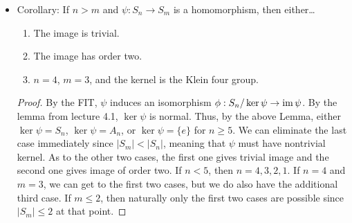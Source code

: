 \documentclass[../notes.tex]{subfiles}
\begin{document}
\begin{itemize}
\begin{proof}
        \underline{$\sigma$ contains exactly two 2-cycles}: Let
        \begin{equation*}
            \sigma = (a_1,a_2)(a_3,a_4)
        \end{equation*}
        Since $n\geq 5$, we may define
        \begin{equation*}
            \sigma' = (a_1,a_5)(a_3,a_4)
        \end{equation*}
        Then
        \begin{equation*}
            \sigma'\sigma^{-1} = (a_1,a_2,a_5)
        \end{equation*}
        as desired.\par
        \underline{$\sigma$ contains three or more 2-cycles}: Let
        \begin{equation*}
            \sigma = (a_1,a_2)(a_3,a_4)(a_5,a_6)\cdots
        \end{equation*}
        Choose
        \begin{equation*}
            \sigma' = (a_1,a_3)(a_2,a_5)(a_4,a_6)\cdots
        \end{equation*}
        Then
        \begin{equation*}
            \sigma'\sigma^{-1} = (a_1,a_5,a_4)(a_2,a_3,a_6)\cdots
        \end{equation*}
        and we have reduced to case 1. This yields the desired result.
    \end{proof}
    \item {}Corollary: If $n>m$ and $\psi:S_n\to S_m$ is a homomorphism, then either\dots
    \begin{enumerate}
        \item The image is trivial.
        \item The image has order two.
        \item $n=4$, $m=3$, and the kernel is the Klein four group.
    \end{enumerate}
    \begin{proof}
        By the FIT, $\psi$ induces an isomorphism $\phi:S_n/\ker\psi\to\operatorname{im}\psi$. By the lemma from lecture 4.1, $\ker\psi$ is normal. Thus, by the above Lemma, either $\ker\psi=S_n$, $\ker\psi=A_n$, or $\ker\psi=\{e\}$ for $n\geq 5$. We can eliminate the last case immediately since $|S_m|<|S_n|$, meaning that $\psi$ must have nontrivial kernel. As to the other two cases, the first one gives trivial image and the second one gives image of order two. If $n<5$, then $n=4,3,2,1$. If $n=4$ and $m=3$, we can get to the first two cases, but we do also have the additional third case. If $m\leq 2$, then naturally only the first two cases are possible since $|S_m|\leq 2$ at that point.

\end{proof}
\end{itemize}
\end{document}
